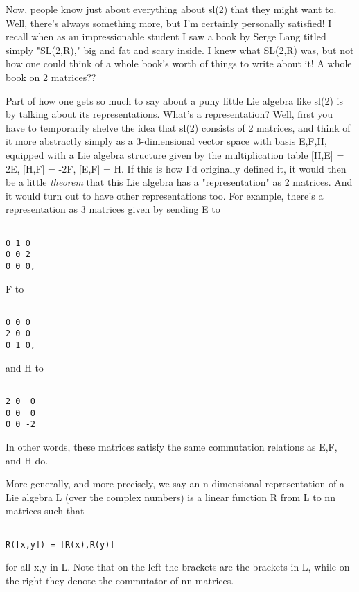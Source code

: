 Now, people know just about everything about sl(2) that they might want
to.  Well, there's always something more, but I'm certainly personally
satisfied!  I recall when as an impressionable student I saw a book by
Serge Lang titled simply "SL(2,R)," big and fat and scary inside.  I
knew what SL(2,R) was, but not how one could think of a whole book's
worth of things to write about it!  A whole book on 2 matrices??  

Part of how one gets so much to say about a puny little Lie algebra
like sl(2) is by talking about its representations.  What's a
representation?  Well, first you have to temporarily shelve the idea
that sl(2) consists of 2 matrices, and think of it more
abstractly simply as a 3-dimensional vector space with basis E,F,H,
equipped with a Lie algebra structure given by the multiplication
table [H,E] = 2E, [H,F] = -2F, [E,F] = H.  If this is how I'd
originally defined it, it would then be a little \emph{theorem} that
this Lie algebra has a "representation" as 2 matrices.  And it
would turn out to have other representations too.  For example,
there's a representation as 3 matrices given by sending E to


\begin{verbatim}

0 1 0
0 0 2
0 0 0, 
\end{verbatim}
    

F to 


\begin{verbatim}

0 0 0 
2 0 0 
0 1 0, 
\end{verbatim}
    

and H to 


\begin{verbatim}

2 0  0 
0 0  0 
0 0 -2
\end{verbatim}
    

In other words, these matrices satisfy the same commutation relations as
E,F, and H do.  

More generally, and more precisely, we say an n-dimensional
representation of a Lie algebra L (over the complex numbers) is a linear
function R from L to n\times n matrices such that


\begin{verbatim}

R([x,y]) = [R(x),R(y)]
\end{verbatim}
    

for all x,y in L.  Note that on the left the brackets are the brackets
in L, while on the right they denote the commutator of n\times n matrices.  


